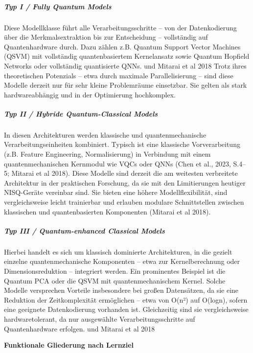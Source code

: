 \subparagraph{Typ I / Fully Quantum Models}
Diese Modellklasse führt alle Verarbeitungsschritte – von der Datenkodierung über die Merkmalsextraktion bis zur Entscheidung – vollständig auf Quantenhardware durch. Dazu zählen z.B. Quantum Support Vector Machines (QSVM) mit vollständig quantenbasiertem Kernelansatz sowie Quantum Hopfield Networks oder vollständig quantisierte QNNs. \cite{chengNoisyIntermediatescaleQuantum2023} und Mitarai et al 2018
Trotz ihres theoretischen Potenzials – etwa durch maximale Parallelisierung – sind diese Modelle derzeit nur für sehr kleine Problemräume einsetzbar. Sie gelten als stark hardwareabhängig und in der Optimierung hochkomplex.

\subparagraph{Typ II / Hybride Quantum-Classical Models}
In diesen Architekturen werden klassische und quantenmechanische Verarbeitungseinheiten kombiniert. Typisch ist eine klassische Vorverarbeitung (z.B. Feature Engineering, Normalisierung) in Verbindung mit einem quantenmechanischen Kernmodul wie VQCs oder QNNs (Chen et al., 2023, S.4–5; Mitarai et al 2018).
Diese Modelle sind derzeit die am weitesten verbreitete Architektur in der praktischen Forschung, da sie mit den Limitierungen heutiger NISQ-Geräte vereinbar sind. Sie bieten eine höhere Modellflexibilität, sind vergleichsweise leicht trainierbar und erlauben modulare Schnittstellen zwischen klassischen und quantenbasierten Komponenten (Mitarai et al 2018).

\subparagraph{ Typ III / Quantum-enhanced Classical Models}
Hierbei handelt es sich um klassisch dominierte Architekturen, in die gezielt einzelne quantenmechanische Komponenten – etwa zur Kernelberechnung oder Dimensionsreduktion – integriert werden. Ein prominentes Beispiel ist die Quantum PCA oder die QSVM mit quantenmechanischem Kernel.
Solche Modelle versprechen Vorteile insbesondere bei großen Datensätzen, da sie eine Reduktion der Zeitkomplexität ermöglichen – etwa von O(n²) auf O(logn), sofern eine geeignete Datenkodierung vorhanden ist. Gleichzeitig sind sie vergleichsweise hardwaretolerant, da nur ausgewählte Verarbeitungsschritte auf Quantenhardware erfolgen.
\cite{chengNoisyIntermediatescaleQuantum2023} und Mitarai et al 2018

\vspace{1em}
\noindent\textbf{Funktionale Gliederung nach Lernziel}

